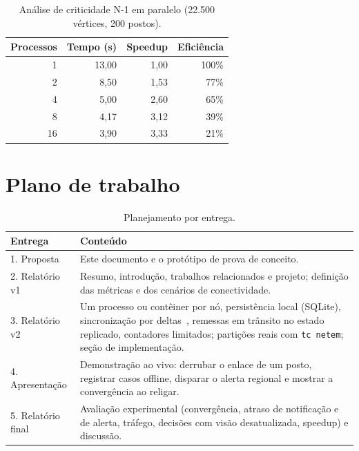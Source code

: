 \documentclass[a4paper,12pt]{article}
\begin{document}
\begin{table}[H]
  \centering
  \caption{Análise de criticidade N-1 em paralelo (22.500 vértices, 200 postos).}
  \label{tab:bench}
  \begin{tabular}{rrrr}
    \toprule
    \textbf{Processos} & \textbf{Tempo (s)} & \textbf{Speedup} & \textbf{Eficiência} \\
    \midrule
     1 & 13,00 & 1,00 & 100\% \\
     2 &  8,50 & 1,53 &  77\% \\
     4 &  5,00 & 2,60 &  65\% \\
     8 &  4,17 & 3,12 &  39\% \\
    16 &  3,90 & 3,33 &  21\% \\
    \bottomrule
  \end{tabular}
\end{table}

\section{Plano de trabalho}
\label{sec:plano}

\begin{table}[H]
  \centering
  \caption{Planejamento por entrega.}
  \label{tab:plano}
  \begin{tabularx}{\textwidth}{lX}
    \toprule
    \textbf{Entrega} & \textbf{Conteúdo} \\
    \midrule
    1. Proposta & Este documento e o protótipo de prova de conceito. \\
    2. Relatório v1 & Resumo, introdução, trabalhos relacionados e projeto;
      definição das métricas e dos cenários de conectividade. \\
    3. Relatório v2 & Um processo ou contêiner por nó, persistência local
      (SQLite), sincronização por deltas~\cite{almeida2018}, remessas em
      trânsito no estado replicado, contadores limitados; partições reais com
      \texttt{tc netem}; seção de implementação. \\
    4. Apresentação & Demonstração ao vivo: derrubar o enlace de um posto,
      registrar casos offline, disparar o alerta regional e mostrar a
      convergência ao religar. \\
    5. Relatório final & Avaliação experimental (convergência, atraso de
      notificação e de alerta, tráfego, decisões com visão desatualizada,
      speedup) e discussão. \\
    \bottomrule
  \end{tabularx}
\end{table}
\end{document}
